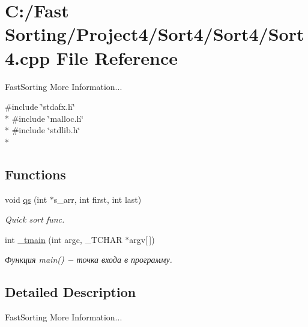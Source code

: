\hypertarget{a00001}{\section{C\-:/\-Fast Sorting/\-Project4/\-Sort4/\-Sort4/\-Sort4.cpp File Reference}
\label{d8/d84/a00001}
}


Fast\-Sorting More Information...  


{\ttfamily \#include \char`\"{}stdafx.\-h\char`\"{}}\\*
{\ttfamily \#include \char`\"{}malloc.\-h\char`\"{}}\\*
{\ttfamily \#include \char`\"{}stdlib.\-h\char`\"{}}\\*
\subsection*{Functions}
\begin{DoxyCompactItemize}
\item 
\hypertarget{a00001_a0663636c4bb3236435dc9caa276749eb}{void \hyperlink{a00001_a0663636c4bb3236435dc9caa276749eb}{qs} (int $\ast$s\-\_\-arr, int first, int last)}\label{d8/d84/a00001_a0663636c4bb3236435dc9caa276749eb}

\begin{DoxyCompactList}\small\item\em Quick sort func. \end{DoxyCompactList}\item 
\hypertarget{a00001_a353674c5af92be7fb389265cde4e5e03}{int \hyperlink{a00001_a353674c5af92be7fb389265cde4e5e03}{\-\_\-tmain} (int argc, \-\_\-\-T\-C\-H\-A\-R $\ast$argv\mbox{[}$\,$\mbox{]})}\label{d8/d84/a00001_a353674c5af92be7fb389265cde4e5e03}

\begin{DoxyCompactList}\small\item\em Функция main() − точка входа в программу. \end{DoxyCompactList}\end{DoxyCompactItemize}


\subsection{Detailed Description}
Fast\-Sorting More Information... 